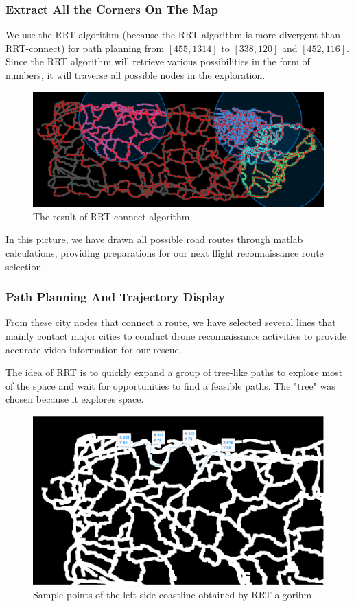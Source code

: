 \documentclass{article} %
\begin{document}
\subsubsection{Extract All the Corners On The Map}
We use the RRT algorithm (because the RRT algorithm is more divergent than 
RRT-connect) for path planning from $[455, 1314]$ to $[338, 120]$ and $[452, 116]$.
Since the RRT algorithm will retrieve various possibilities in the form of 
numbers, it will traverse all possible nodes in the exploration.
\begin{figure}[h]
    \centering
    \includegraphics[scale=0.2]{all_nodes.png}
    \caption{The result of RRT-connect algorithm.}
\end{figure}

In this picture, we have drawn all possible road routes through matlab calculations, providing preparations for our next flight reconnaissance route selection.

\subsubsection{Path Planning And Trajectory Display}
From these city nodes that connect a route, we have selected several lines that mainly contact major cities to conduct drone reconnaissance activities
to provide accurate video information for our rescue.

The idea of RRT is to quickly expand a group of tree-like paths to explore most of the space 
and wait for opportunities to find a feasible paths. The "tree" was chosen because it explores space.


\begin{figure}[h]
    \centering
    \includegraphics[scale=0.3]{sample_point_in_left_side_coastline.png}
    \caption{Sample points of the left side coastline obtained by RRT algorihm}
\end{figure}   
\end{document}
